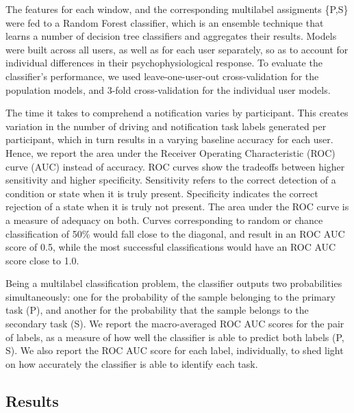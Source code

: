 The features for each window, and the corresponding multilabel assigments \{P,S\} were fed to a Random Forest classifier, which is an ensemble technique that learns a number of decision tree classifiers and aggregates their results. Models were built across all users, as well as for each user separately, so as to account for individual differences in their psychophysiological response. To evaluate the classifier's performance, we used leave-one-user-out cross-validation for the population models, and 3-fold cross-validation for the individual user models. 

The time it takes to comprehend a notification varies by participant. This creates variation in the number of driving and notification task labels generated per participant, which in turn results in a varying baseline accuracy for each user. Hence, we report the area under  the Receiver Operating Characteristic (ROC) curve (AUC) instead of accuracy. ROC curves show the tradeoffs between higher sensitivity and higher specificity. Sensitivity refers to the correct detection of a condition or state when it is truly present. Specificity indicates the correct rejection of a state when it is truly not present. The area under the ROC curve is a measure of adequacy on both. Curves corresponding to random or chance classification of 50\% would fall close to the diagonal, and result in an ROC AUC score of 0.5, while the most successful classifications would have an ROC AUC score close to 1.0. 

Being a multilabel classification problem, the classifier outputs two probabilities simultaneously: one for the probability of the sample belonging to the primary task (P), and another for the probability that the sample belongs to the secondary task (S). We report the macro-averaged ROC AUC scores for the pair of labels, as a measure of how well the classifier is able to predict both labels (P, S). We also report the ROC AUC score for each label, individually, to shed light on how accurately the classifier is able to identify each task.

\subsection{Results}

